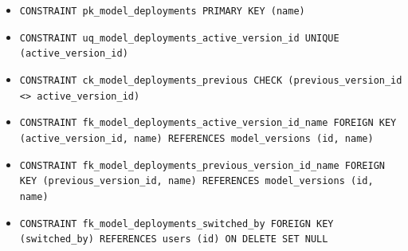 \begin{itemize}
\item \raggedright {\small\texttt{CONSTRAINT pk\_\allowbreak{}\allowbreak{}model\_\allowbreak{}\allowbreak{}deployments PRIMARY KEY (name)}}
\item \raggedright {\small\texttt{CONSTRAINT uq\_\allowbreak{}\allowbreak{}model\_\allowbreak{}\allowbreak{}deployments\_\allowbreak{}\allowbreak{}active\_\allowbreak{}\allowbreak{}version\_\allowbreak{}\allowbreak{}id UNIQUE (active\_\allowbreak{}\allowbreak{}version\_\allowbreak{}\allowbreak{}id)}}
\item \raggedright {\small\texttt{CONSTRAINT ck\_\allowbreak{}\allowbreak{}model\_\allowbreak{}\allowbreak{}deployments\_\allowbreak{}\allowbreak{}previous CHECK (previous\_\allowbreak{}\allowbreak{}version\_\allowbreak{}\allowbreak{}id <> active\_\allowbreak{}\allowbreak{}version\_\allowbreak{}\allowbreak{}id)}}
\item \raggedright {\small\texttt{CONSTRAINT fk\_\allowbreak{}\allowbreak{}model\_\allowbreak{}\allowbreak{}deployments\_\allowbreak{}\allowbreak{}active\_\allowbreak{}\allowbreak{}version\_\allowbreak{}\allowbreak{}id\_\allowbreak{}\allowbreak{}name FOREIGN KEY (active\_\allowbreak{}\allowbreak{}version\_\allowbreak{}\allowbreak{}id, name) REFERENCES model\_\allowbreak{}\allowbreak{}versions (id, name)}}
\item \raggedright {\small\texttt{CONSTRAINT fk\_\allowbreak{}\allowbreak{}model\_\allowbreak{}\allowbreak{}deployments\_\allowbreak{}\allowbreak{}previous\_\allowbreak{}\allowbreak{}version\_\allowbreak{}\allowbreak{}id\_\allowbreak{}\allowbreak{}name FOREIGN KEY (previous\_\allowbreak{}\allowbreak{}version\_\allowbreak{}\allowbreak{}id, name) REFERENCES model\_\allowbreak{}\allowbreak{}versions (id, name)}}
\item \raggedright {\small\texttt{CONSTRAINT fk\_\allowbreak{}\allowbreak{}model\_\allowbreak{}\allowbreak{}deployments\_\allowbreak{}\allowbreak{}switched\_\allowbreak{}\allowbreak{}by FOREIGN KEY (switched\_\allowbreak{}\allowbreak{}by) REFERENCES users (id) ON DELETE SET NULL}}
\end{itemize}
